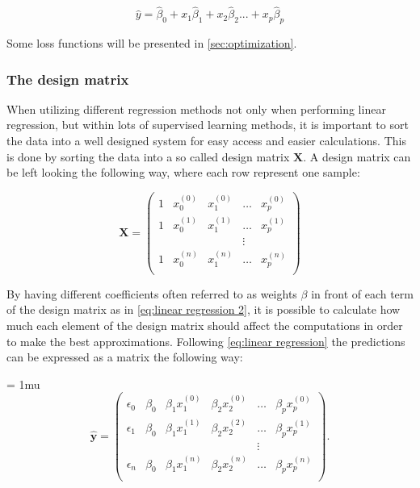 \documentclass[../main.tex]{subfiles}
\begin{document}
\begin{equation}
    \hat{y}=\hat{\beta}_0+x_1\hat{\beta}_1+x_2\hat{\beta}_2...+x_{p}\hat{\beta}_p
    \label{eq:linear regression 2}
\end{equation}

Some loss functions will be presented in \autoref{sec:optimization}.

\subsubsection{The design matrix}
When utilizing different regression methods not only when performing linear regression, but within lots of supervised learning methods, it is important to sort the data into a well designed system for easy access and easier calculations. This is done by sorting the data into a so called design matrix $\textbf{X}$. A design matrix can be left looking the following way, where each row represent one sample:

\begin{equation*}
\mathbf X=  \begin{pmatrix}
   1& x_0^{(0)} & x_1^{(0)} & \ldots & x_{p}^{(0)}\\
   1& x_0^{(1)} & x_1^{(1)} & \ldots & x_{p}^{(1)}\\
     &  &  & \vdots & \\
    1& x_0^{(n)} & x_1^{(n)} & \ldots & x_{p}^{(n)}\\
 \end{pmatrix}
\end{equation*}

By having different coefficients often referred to as weights $\beta$ in front of each term of the design matrix as in \autoref{eq:linear regression 2}, it is possible to calculate how much each element of the design matrix should affect the computations in order to make the best approximations. Following \autoref{eq:linear regression} the predictions can be expressed as a matrix the following way:

\begin{frame}
\footnotesize
\setlength{\arraycolsep}{2.5pt} %
\medmuskip = 1mu %
\begin{equation*}
  \hat{\mathbf y}=  \begin{pmatrix}
    \epsilon_0 & \beta_0 & \beta_1 x_1^{(0)} &  \beta_2 x_2^{(0)} & \ldots &  \beta_p x_{p}^{(0)}\\
    \epsilon_1 & \beta_0 & \beta_1 x_1^{(1)} &  \beta_2 x_2^{(2)} & \ldots &  \beta_p x_{p}^{(1)}\\
     &  &  &  & \vdots & \\
    \epsilon_{n} & \beta_0 & \beta_1 x_1^{(n)} &  \beta_2 x_2^{(n)} & \ldots &  \beta_{p} x_{p}^{(n)}\\
 \end{pmatrix}.
\end{equation*}
\end{frame}
\end{document}
